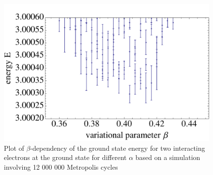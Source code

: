 \begin{figure}[htbp]
    \centering
    \includegraphics[scale=0.45]{VMCfein}
    \caption{Plot of $\beta$-dependency of the ground state energy for two interacting electrons at the ground state for different $\alpha$ based on a simulation involving 12 000 000 Metropolis cycles}
    \label{fig:VMCfein}
\end{figure}
\FloatBarrier
